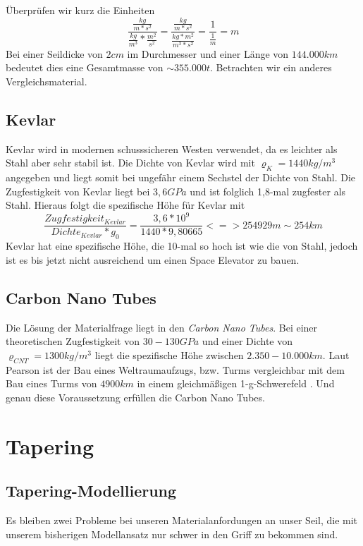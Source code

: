 \documentclass[a4paper, 10pt]{report}
\begin{document}
Überprüfen wir kurz die Einheiten
\begin{equation}
\frac{\frac{kg}{m*s^2}}{\frac{kg}{m^3}*\frac{m^2}{s^2}}= \frac{\frac{kg}{m*s^2}}{\frac{kg*m^2}{m^3*s^2}} = \frac{1}{\frac{1}{m}} = m
\end{equation}
Bei einer Seildicke von $2 cm$ im Durchmesser und einer Länge von $144.000 km$ bedeutet dies eine Gesamtmasse von $\sim 355.000 t$.\cite{PE75}
Betrachten wir ein anderes Vergleichsmaterial.
\subsection{Kevlar}
Kevlar wird in modernen schusssicheren Westen verwendet, da es leichter als Stahl aber sehr stabil ist. Die Dichte von Kevlar wird mit $\varrho_K = 1440 kg/m^3$ angegeben und liegt somit bei ungefähr einem Sechstel der Dichte von Stahl. Die Zugfestigkeit von Kevlar liegt bei $3,6 GPa$ und ist folglich 1,8-mal zugfester als Stahl. Hieraus folgt die spezifische Höhe für Kevlar mit
\begin{equation}
\frac{Zugfestigkeit_{Kevlar}}{Dichte_{Kevlar}*g_0} = \frac{3,6*10^9}{1440*9,80665}
<=> 254 929 m \sim 254 km 
\end{equation}
Kevlar hat eine spezifische Höhe, die 10-mal so hoch ist wie die von Stahl, jedoch ist es bis jetzt nicht ausreichend um einen Space Elevator zu bauen. \cite{PE75}
\subsection{Carbon Nano Tubes}
\label{sec:cnt}
Die Lösung der Materialfrage liegt in den \textsl{Carbon Nano Tubes}.
Bei einer theoretischen Zugfestigkeit von $30 - 130 GPa$ und einer Dichte von $\varrho_{CNT} = 1300 kg/m^3$ liegt die spezifische Höhe zwischen $2.350 - 10.000 km$. Laut Pearson ist der Bau eines Weltraumaufzugs, bzw. Turms vergleichbar mit dem Bau eines Turms von $4900 km$ in einem gleichmäßigen 1-g-Schwerefeld \cite{PE75}. Und genau diese Voraussetzung erfüllen die Carbon Nano Tubes.
\section{Tapering}
\subsection{Tapering-Modellierung}
Es bleiben zwei Probleme bei unseren Materialanfordungen an unser Seil, die mit unserem bisherigen Modellansatz nur schwer in den Griff zu bekommen sind.
\end{document}
